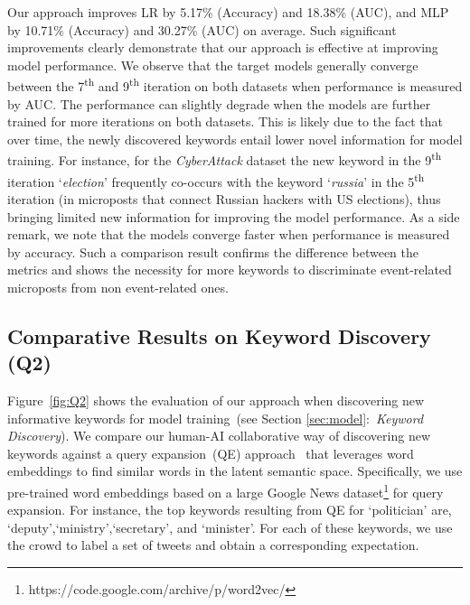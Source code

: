 \documentclass[letterpaper]{article}
\begin{document}
Our approach improves LR by 5.17\% (Accuracy) and 18.38\% (AUC), and MLP by 10.71\% (Accuracy) and 30.27\% (AUC) on average. Such significant improvements clearly demonstrate that our approach is effective at improving model performance. We observe that the target models generally converge between the 7\textsuperscript{th} and 9\textsuperscript{th} iteration on both datasets when performance is measured by AUC. 
The performance can slightly degrade when the models are further trained for more iterations on both datasets. This is likely due to the fact that over time, the newly discovered keywords entail lower novel information for model training. For instance, for the \emph{CyberAttack} dataset the new keyword in the 9\textsuperscript{th} iteration \lq \textit{election}' frequently co-occurs with the keyword \lq \textit{russia}' in the 5\textsuperscript{th} iteration (in microposts that connect Russian hackers with US elections), thus bringing limited new information for improving the model performance. As a side remark, we note that the models converge faster when performance is measured by accuracy. Such a comparison result confirms the difference between the metrics and shows the necessity for more keywords to discriminate event-related microposts from non event-related ones.

\subsection{Comparative Results on Keyword Discovery (Q2)}

Figure~\ref{fig:Q2} shows the evaluation of our approach when discovering new informative keywords for model training~(see Section \ref{sec:model}:~\emph{Keyword Discovery}). We compare our human-AI collaborative way of discovering new keywords against a query expansion~(QE) approach~\cite{diaz2016query,kuzi2016query} that leverages word embeddings to find similar words in the latent semantic space. Specifically, we use pre-trained word embeddings based on a large Google News dataset\footnote{https://code.google.com/archive/p/word2vec/} for query expansion. For instance, the top keywords resulting from QE for \lq politician' are, \lq deputy',\lq ministry',\lq secretary', and \lq minister'. For each of these keywords, we use the crowd to label a set of tweets and obtain a corresponding expectation.
\end{document}
